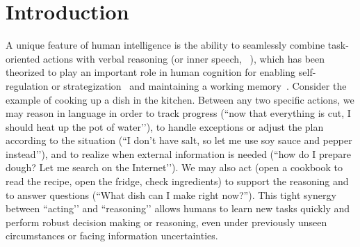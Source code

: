 \section{Introduction}


A unique feature of human intelligence is the ability to seamlessly combine task-oriented actions with verbal reasoning (or inner speech, ~\citealp{alderson2015inner}), which has been theorized to play an important role in human cognition for enabling self-regulation or strategization~\citep{vygotsky1987thinking,luria1965ls,fernyhough2010vygotsky} and maintaining a working memory~\citep{baddeley1992working}.
Consider the example of cooking up a dish in the kitchen. Between any two specific actions, we may reason in language in order to track progress (``now that everything is cut, I should heat up the pot of water’’), to handle exceptions or adjust the plan according to the situation (``I don’t have salt, so let me use soy sauce and pepper instead’’), and to realize when external information is needed (``how do I prepare dough? Let me search on the Internet’’). 
We may also act (open a cookbook to read the recipe, open the fridge, check ingredients) to support the reasoning and to answer questions (``What dish can I make right now?'').
This tight synergy between ``acting'’ and ``reasoning'’ allows humans to learn new tasks quickly and perform robust decision making or reasoning, even under previously unseen circumstances or facing information uncertainties.



